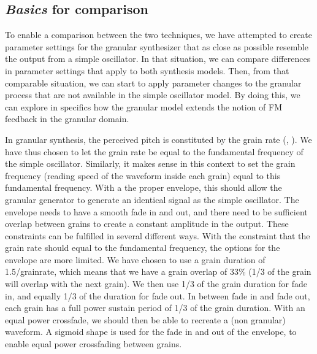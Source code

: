 \documentclass[runningheads,a4paper]{llncs}
\begin{document}
\subsection{\emph{Basics} for comparison}
To enable a comparison between the two techniques, we have attempted to create parameter settings for the granular synthesizer that as close as possible resemble the output from a simple oscillator. In that situation, we can compare differences in parameter settings that apply to both synthesis models. Then, from that comparable situation, we can start to apply parameter changes to the granular process that are not available in the simple oscillator model. By doing this, we can explore in specifics how the granular model extends the notion of FM feedback in the granular domain.

In granular synthesis, the perceived pitch is constituted by the grain rate (\cite{Roads-2001}, \cite{Brandtsegg-particle}). We have thus chosen to let the grain rate be equal to the fundamental frequency of the simple oscillator. Similarly, it makes sense in this context to set the grain frequency (reading speed of the waveform inside each grain) equal to this fundamental frequency. With a the proper envelope, this should allow the granular generator to generate an identical signal as the simple oscillator. The envelope needs to have a smooth fade in and out, and there need to be sufficient overlap between grains to create a constant amplitude in the output. These constraints can be fulfilled in several different ways. With the constraint that the grain rate should equal to the fundamental frequency, the options for the envelope are more limited. We have chosen to use a grain duration of 1.5/grainrate, which means that we have a grain overlap of 33\% (1/3 of the grain will overlap with the next grain). We then use 1/3 of the grain duration for fade in, and equally 1/3 of the duration for fade out. In between fade in and fade out, each grain has a full power sustain period of 1/3 of the grain duration. With an equal power crossfade, we should then be able to recreate a (non granular) waveform. A sigmoid shape is used for the fade in and out of the envelope, to enable equal power crossfading between grains. 
\end{document}

